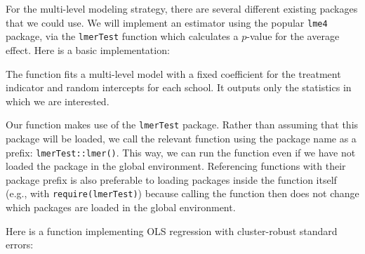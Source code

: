 \documentclass[
]{book}
\newenvironment{Shaded}{\begin{snugshade}}{\end{snugshade}}
\newcommand{\AttributeTok}[1]{\textcolor[rgb]{0.13,0.29,0.53}{#1}}
\newcommand{\ControlFlowTok}[1]{\textcolor[rgb]{0.13,0.29,0.53}{\textbf{#1}}}
\newcommand{\DecValTok}[1]{\textcolor[rgb]{0.00,0.00,0.81}{#1}}
\newcommand{\FunctionTok}[1]{\textcolor[rgb]{0.13,0.29,0.53}{\textbf{#1}}}
\newcommand{\NormalTok}[1]{#1}
\newcommand{\OtherTok}[1]{\textcolor[rgb]{0.56,0.35,0.01}{#1}}
\newcommand{\SpecialCharTok}[1]{\textcolor[rgb]{0.81,0.36,0.00}{\textbf{#1}}}
\newcommand{\StringTok}[1]{\textcolor[rgb]{0.31,0.60,0.02}{#1}}
\begin{document}
For the multi-level modeling strategy, there are several different existing packages that we could use.
We will implement an estimator using the popular \texttt{lme4} package, via the \texttt{lmerTest} function which calculates a \(p\)-value for the average effect.
Here is a basic implementation:

\begin{Shaded}
\end{Shaded}

The function fits a multi-level model with a fixed coefficient for the treatment indicator and random intercepts for each school.
It outputs only the statistics in which we are interested.

Our function makes use of the \texttt{lmerTest} package.
Rather than assuming that this package will be loaded, we call the relevant function using the package name as a prefix: \texttt{lmerTest::lmer()}.
This way, we can run the function even if we have not loaded the package in the global environment.
Referencing functions with their package prefix is also preferable to loading packages inside the function itself (e.g., with \texttt{require(lmerTest)}) because calling the function then does not change which packages are loaded in the global environment.

Here is a function implementing OLS regression with cluster-robust standard errors:
\end{document}
